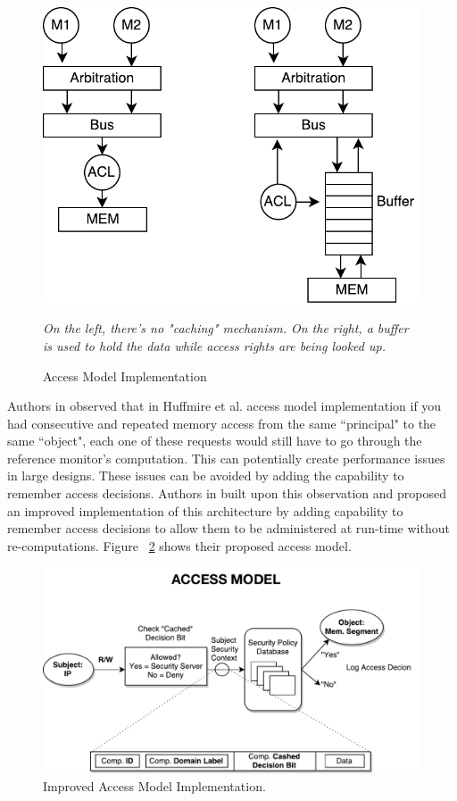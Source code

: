 \documentclass[sigconf]{acmart}
\theoremstyle{plain}
\theoremstyle{remark}
\begin{document}
\begin{figure}[hbt]
\centering
\includegraphics[width=0.75\columnwidth]{figures/ted_access.pdf}
\caption{Access Model Implementation}
\textit{On the left, there's no "caching" mechanism. On the right, a buffer is used to hold the data while access rights are being looked up.} %
\label{fig:ted}
\end{figure}



Authors in \cite{FestusFCCM} observed that in Huffmire et al. access model implementation if you had consecutive and repeated memory access from the same ``principal" to the same ``object", each one of these requests would still have to go through the reference monitor's computation. This can potentially create performance issues in large designs. These issues can be avoided by adding the capability to remember access decisions. Authors in \cite{FestusFCCM} built upon this observation and proposed an improved implementation of this architecture by adding capability to remember access decisions to allow them to be administered at run-time without re-computations. Figure ~\ref{fig:access} shows their proposed access model.

\begin{figure}[hbt]
\centering
\includegraphics[width=1\columnwidth]{figures/access.pdf}
\caption{Improved Access Model Implementation.} %
\label{fig:access}
\end{figure}
\end{document}
